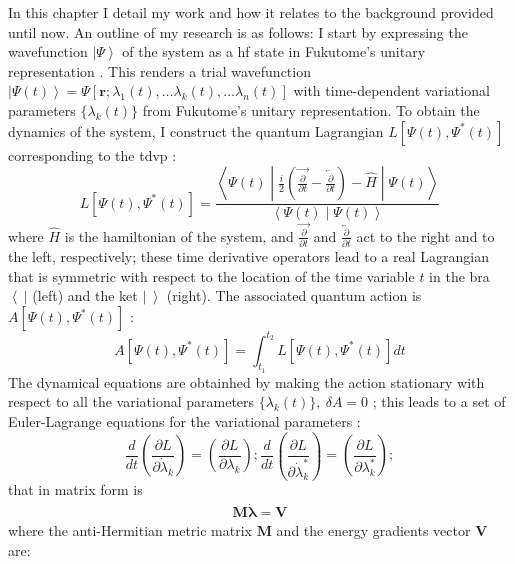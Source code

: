 \documentclass{aux/ttuthes2007}
\newcommand{\bra}[1]{\ensuremath{\left\langle#1\right\vert}}
\newcommand{\ket}[1]{\ensuremath{\left|#1\right\rangle}}
\newcommand{\braket}[2]{\left< #1 \middle\vert #2 \right>}
\newcommand{\sandwich}[3]{\left< #1 \middle\vert #2 \middle\vert #3 \right>}
\newcommand{\paren}[1]{\left( #1 \right)}
\newcommand{\ddt}{\frac{d}{dt}}
\newcommand{\pd}[1]{\frac{\partial}{\partial #1}}
\newcommand{\fpd}[2]{\frac{\partial #1}{\partial #2}}
\begin{document}
In this chapter I detail my work and how it relates to the background provided until now.
An outline of my research is as follows: I start by expressing the wavefunction $\ket\Psi$ of the system as a \gls{hf} state in Fukutome's unitary representation .
This renders a trial wavefunction $\ket{\Psi(t)} = \Psi \left[ \bm r; \lambda_1(t), \ldots \lambda_k(t), \ldots \lambda_n(t) \right]$ with time-dependent variational parameters $\{\lambda_k(t)\}$ from Fukutome's unitary representation.
To obtain the dynamics of the system, I construct the quantum Lagrangian $L\left [ \Psi(t), \Psi^*(t) \right]$ corresponding to the \gls{tdvp} :
\[
	L\left [ \Psi(t), \Psi^*(t) \right]
	= \frac{\sandwich{\Psi(t)}{\frac{i}{2}\left(\overrightarrow{\pd t} - \overleftarrow{\pd t}\right) - \hat H}{\Psi(t)}}{\braket{\Psi(t)}{\Psi(t)}}
\]
%
where $\hat H$ is the hamiltonian of the system, and $\overrightarrow{\pd t}$ and $\overleftarrow{\pd t}$ act to the right and to the left, respectively;
these time derivative operators lead to a real Lagrangian that is symmetric with respect to the location of the time variable $t$ in the bra $\bra{\ }$ (left) and the ket $\ket{\ }$ (right).
The associated quantum action is $A \left[ \Psi(t), \Psi^*(t) \right]$ :
\[
	A\left [ \Psi(t), \Psi^*(t) \right]
	= \int_{t_1}^{t_2} L\left [ \Psi(t), \Psi^*(t) \right] dt
\]
%
The dynamical equations are obtainhed by making the action stationary with respect to all the variational parameters $\{\lambda_k(t)\},\ \delta A = 0$ ; this leads to a set of Euler-Lagrange equations for the variational parameters :
%
\[
	\ddt\paren{\fpd {L}{\dot \lambda_k}} = \paren{\fpd {L} {\lambda_k}};
	\ddt\paren{\fpd {L}{\dot \lambda_k^*}} = \paren{\fpd {L} {\lambda_k^*}};
\]
%
that in matrix form is
%
\begin{equation}
	\begin{split}
		\label{eq:ml=v}
		\bm M \dot {\bm \lambda} = \bm V
	\end{split}
\end{equation}
%
where the anti-Hermitian metric matrix $\bm M$ and the energy gradients vector $\bm V$ are:
\end{document}
